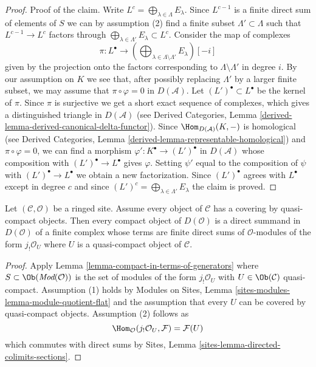 \begin{proof}
\medskip\noindent
Proof of the claim. Write $L^c = \bigoplus_{\lambda \in \Lambda} E_\lambda$.
Since $L^{c - 1}$ is a finite direct sum of elements of $S$
we can by assumption (2) find a finite subset
$\Lambda' \subset \Lambda$ such that $L^{c - 1} \to L^c$ factors
through $\bigoplus_{\lambda \in \Lambda'} E_\lambda \subset L^c$.
Consider the map of complexes
$$
\pi :
L^\bullet
\longrightarrow
(\bigoplus\nolimits_{\lambda \in \Lambda \setminus \Lambda'} E_\lambda)[-i]
$$
given by the projection onto the factors corresponding to
$\Lambda \setminus \Lambda'$ in degree $i$.
By our assumption on $K$ we see that, after possibly replacing $\Lambda'$ by
a larger finite subset, we may assume that $\pi \circ \varphi = 0$
in $D(\mathcal{A})$.
Let $(L')^\bullet \subset L^\bullet$ be the kernel of $\pi$.
Since $\pi$ is surjective we get a short exact sequence of complexes,
which gives a distinguished triangle in $D(\mathcal{A})$ (see
Derived Categories, Lemma \ref{derived-lemma-derived-canonical-delta-functor}).
Since $\Hom_{D(\mathcal{A})}(K, -)$ is homological (see
Derived Categories, Lemma \ref{derived-lemma-representable-homological})
and $\pi \circ \varphi = 0$, we can find a morphism
$\varphi' : K^\bullet \to (L')^\bullet$ in $D(\mathcal{A})$ whose
composition with $(L')^\bullet \to L^\bullet$ gives $\varphi$.
Setting $\psi'$ equal to the composition of $\psi$ with
$(L')^\bullet \to L^\bullet$ we obtain a new factorization.
Since $(L')^\bullet$ agrees with $L^\bullet$ except in degree $c$
and since $(L')^c = \bigoplus_{\lambda \in \Lambda'} E_\lambda$ the
claim is proved.
\end{proof}

\begin{lemma}
\label{lemma-compact-objects-if-enough-qc}
Let $(\mathcal{C}, \mathcal{O})$ be a ringed site. Assume every object of
$\mathcal{C}$ has a covering by quasi-compact objects. Then every
compact object of $D(\mathcal{O})$ is a direct summand in $D(\mathcal{O})$
of a finite complex whose terms are finite direct sums of
$\mathcal{O}$-modules of the form $j_!\mathcal{O}_U$
where $U$ is a quasi-compact object of $\mathcal{C}$.
\end{lemma}

\begin{proof}
Apply Lemma \ref{lemma-compact-in-terms-of-generators}
where $S \subset \Ob(\textit{Mod}(\mathcal{O}))$ is the set of modules
of the form $j_!\mathcal{O}_U$ with $U \in \Ob(\mathcal{C})$
quasi-compact. Assumption (1) holds by
Modules on Sites, Lemma \ref{sites-modules-lemma-module-quotient-flat}
and the assumption that every $U$ can be covered by quasi-compact
objects. Assumption (2) follows as
$$
\Hom_\mathcal{O}(j_!\mathcal{O}_U, \mathcal{F}) = \mathcal{F}(U)
$$
which commutes with direct sums by
Sites, Lemma \ref{sites-lemma-directed-colimits-sections}.
\end{proof}

